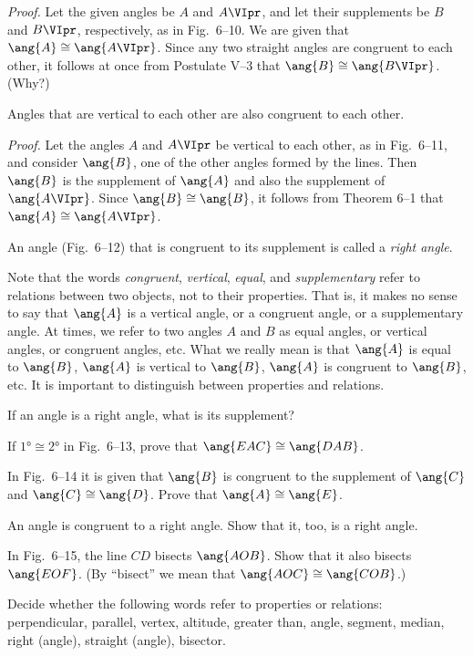 \documentclass[11pt]{book}
\theoremstyle{bkplain}
\theoremstyle{XIplainnote}
\theoremstyle{bkplain}
\theoremstyle{bkplain}
\begin{document}
\emph{Proof.} Let the given angles be $A$ and $A\VIpr$, and let their
supplements be $B$ and $B\VIpr$, respectively, as in Fig.~6--10. We are given
that $\ang{A} \cong \ang{A\VIpr}$. Since any two straight angles are congruent
to each other, it follows at once from Postulate V--3 that $\ang{B} \cong
\ang{B\VIpr}$. (Why?)

\FIGVITENELEVENTWELVE

\begin{theorem}
Angles that are vertical to each other are also congruent to each other.
\end{theorem}

\emph{Proof.} Let the angles $A$ and $A\VIpr$ be vertical to each other, as in
Fig.~6--11, and consider $\ang{B}$, one of the other angles formed by the
lines. Then $\ang{B}$ is the supplement of $\ang{A}$ and also the supplement of
$\ang{A\VIpr}$. Since $\ang{B} \cong \ang{B}$, it follows from Theorem 6--1
that $\ang{A} \cong \ang{A\VIpr}$.

\begin{definition}
An angle (Fig.~6--12) that is congruent to its supplement is called a
\emph{right angle}.
\end{definition}

\begin{remark}
Note that the words \emph{congruent}, \emph{vertical}, \emph{equal}, and
\emph{supplementary} refer to relations between two objects, not to their
properties. That is, it makes no sense to say that $\ang{A}$ is a vertical
angle, or a congruent angle, or a supplementary angle. At times, we refer to
two angles $A$ and $B$ as equal angles, or vertical angles, or congruent
angles, etc. What we really mean is that $\ang{A}$ is equal to $\ang{B}$,
$\ang{A}$ is vertical to $\ang{B}$, $\ang{A}$ is congruent to $\ang{B}$, etc.
It is important to distinguish between properties and relations.
\end{remark}

\begin{exercisecols}
\begin{exlist}
\item If an angle is a right angle, what is its supplement?
\item If $\ang{1} \cong \ang{2}$ in Fig.~6--13, prove that $\ang{EAC} \cong
  \ang{DAB}$.
\exfig{\FIGVITHIRTEEN}
\item In Fig.~6--14 it is given that $\ang{B}$ is congruent to the supplement
  of $\ang{C}$ and $\ang{C} \cong \ang{D}$. Prove that $\ang{A} \cong \ang{E}$.
\exfig{\FIGVIFOURTEEN}
\item[\stex 4.] An angle is congruent to a right angle. Show that it, too, is a
  right angle.
\item[5.] In Fig.~6--15, the line $CD$ bisects $\ang{AOB}$. Show that it also
  bisects $\ang{EOF}$. (By ``bisect'' we mean that $\ang{AOC} \cong \ang{COB}$.)
\exfig{\FIGVIFIFTEEN}
\item[6.] Decide whether the following words refer to properties or relations:
  perpendicular, parallel, vertex, altitude, greater than, angle, segment,
  median, right (angle), straight (angle), bisector.
\end{exlist}
\end{exercisecols}
\end{document}
